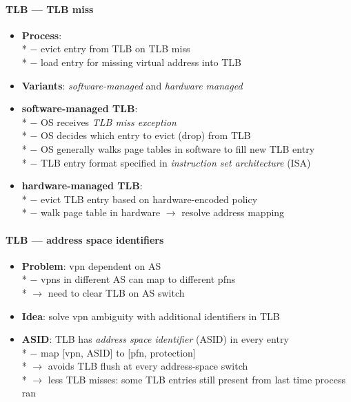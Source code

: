 \paragraph{TLB --- TLB miss}
\begin{itemize}
  \item \textbf{Process}: \\*
    $ - $ evict entry from TLB on TLB miss \\*
    $ - $ load entry for missing virtual address into TLB
  \item \textbf{Variants}: \emph{software-managed} and \emph{hardware managed}
  \item \textbf{software-managed TLB}: \\*
    $ - $ OS receives \emph{TLB miss exception} \\*
    $ - $ OS decides which entry to evict (drop) from TLB \\*
    $ - $ OS generally walks page tables in software to fill new TLB entry \\*
    $ - $ TLB entry format specified in \emph{instruction set architecture} (ISA)
  \item \textbf{hardware-managed TLB}: \\*
    $ - $ evict TLB entry based on hardware-encoded policy \\*
    $ - $ walk page table in hardware $ \to $ resolve address mapping
\end{itemize}

\paragraph{TLB --- address space identifiers}
\begin{itemize}
  \item \textbf{Problem}: vpn dependent on AS \\*
    $ - $ vpns in different AS can map to different pfns \\*
    $ \to $ need to clear TLB on AS switch
  \item \textbf{Idea}: solve vpn ambiguity with additional identifiers in TLB
  \item \textbf{ASID}: TLB has \emph{address space identifier} (ASID) in every entry \\*
    $ - $ map [vpn, ASID] to [pfn, protection] \\*
    $ \to $ avoids TLB flush at every address-space switch \\*
    $ \to $ less TLB misses: some TLB entries still present from last time process ran
\end{itemize}

